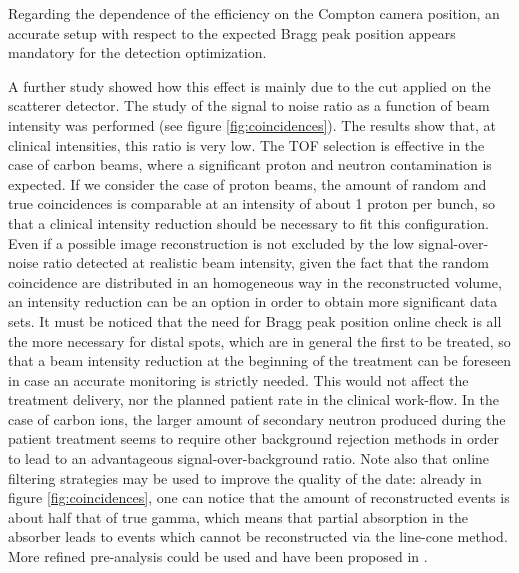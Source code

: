 Regarding the dependence of the efficiency on the Compton camera position, an accurate setup with respect to the expected Bragg peak position appears mandatory for the detection optimization.

A further study showed how this effect is mainly due to the cut applied on the scatterer detector. 
The study of the signal to noise ratio as a function of beam intensity was performed (see figure \ref{fig:coincidences}). The results show that, at clinical intensities, this ratio is very low. The TOF selection is effective in the case of carbon beams, where a significant proton and neutron contamination is expected. If we consider the case of proton beams, the amount of random and true coincidences is comparable at an intensity of about 1 proton per bunch, so that a clinical intensity reduction should be necessary to fit this configuration. Even if a possible image reconstruction is not excluded by the low signal-over-noise ratio detected at realistic beam intensity, given the fact that the random coincidence are distributed in an homogeneous way in the reconstructed volume, an intensity reduction can be an option in order to obtain more significant data sets. It must be noticed that the need for Bragg peak position online check is all the more necessary for distal spots, which are in general the first to be treated, so that a beam intensity reduction at the beginning of the treatment can be foreseen in case an accurate monitoring is strictly needed. This would not affect the treatment delivery, nor the planned patient rate in the clinical work-flow. 
In the case of carbon ions, the larger amount of secondary neutron produced during the patient treatment seems to require other background rejection methods in order to lead to an advantageous signal-over-background ratio. Note also that online filtering strategies  may be used to improve the quality of the date: already in figure \ref{fig:coincidences}, one can notice that the amount of reconstructed events is about half that of true gamma, which means that partial absorption in the absorber leads to events which cannot be reconstructed via the line-cone method. More refined pre-analysis could be used and have been proposed in \cite{Draeger:2017aa}.

